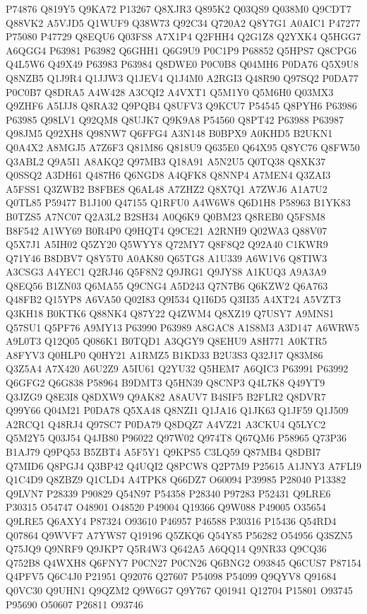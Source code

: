 P74876
Q819Y5
Q9KA72
P13267
Q8XJR3
Q895K2
Q03QS9
Q038M0
Q9CDT7
Q88VK2
A5VJD5
Q1WUF9
Q38W73
Q92C34
Q720A2
Q8Y7G1
A0AIC1
P47277
P75080
P47729
Q8EQU6
Q03FS8
A7X1P4
Q2FHH4
Q2G1Z8
Q2YXK4
Q5HGG7
A6QGG4
P63981
P63982
Q6GHH1
Q6G9U9
P0C1P9
P68852
Q5HPS7
Q8CPG6
Q4L5W6
Q49X49
P63983
P63984
Q8DWE0
P0C0B8
Q04MH6
P0DA76
Q5X9U8
Q8NZB5
Q1J9R4
Q1JJW3
Q1JEV4
Q1J4M0
A2RGI3
Q48R90
Q97SQ2
P0DA77
P0C0B7
Q8DRA5
A4W428
A3CQI2
A4VXT1
Q5M1Y0
Q5M6H0
Q03MX3
Q9ZHF6
A5IJJ8
Q8RA32
Q9PQB4
Q8UFV3
Q9KCU7
P54545
Q8PYH6
P63986
P63985
Q98LV1
Q92QM8
Q8UJK7
Q9K9A8
P54560
Q8PT42
P63988
P63987
Q98JM5
Q92XH8
Q98NW7
Q6FFG4
A3N148
B0BPX9
A0KHD5
B2UKN1
Q0A4X2
A8MGJ5
A7Z6F3
Q81M86
Q818U9
Q635E0
Q64X95
Q8YC76
Q8FW50
Q3ABL2
Q9A5I1
A8AKQ2
Q97MB3
Q18A91
A5N2U5
Q0TQ38
Q8XK37
Q0SSQ2
A3DH61
Q487H6
Q6NGD8
A4QFK8
Q8NNP4
A7MEN4
Q3ZAI3
A5FSS1
Q3ZWB2
B8FBE8
Q6AL48
A7ZHZ2
Q8X7Q1
A7ZWJ6
A1A7U2
Q0TL85
P59477
B1J100
Q47155
Q1RFU0
A4W6W8
Q6D1H8
P58963
B1YK83
B0TZS5
A7NC07
Q2A3L2
B2SH34
A0Q6K9
Q0BM23
Q8REB0
Q5FSM8
B8F542
A1WY69
B0R4P0
Q9HQT4
Q9CE21
A2RNH9
Q02WA3
Q88V07
Q5X7J1
A5IH02
Q5ZY20
Q5WYY8
Q72MY7
Q8F8Q2
Q92A40
C1KWR9
Q71Y46
B8DBV7
Q8Y5T0
A0AK80
Q65TG8
A1U339
A6W1V6
Q8TIW3
A3CSG3
A4YEC1
Q2RJ46
Q5F8N2
Q9JRG1
Q9JYS8
A1KUQ3
A9A3A9
Q8EQ56
B1ZN03
Q6MA55
Q9CNG4
A5D243
Q7N7B6
Q6KZW2
Q6A763
Q48FB2
Q15YP8
A6VA50
Q02I83
Q9I534
Q1I6D5
Q3II35
A4XT24
A5VZT3
Q3KH18
B0KTK6
Q88NK4
Q87Y22
Q4ZWM4
Q8XZ19
Q7USY7
A9MNS1
Q57SU1
Q5PF76
A9MY13
P63990
P63989
A8GAC8
A1S8M3
A3D147
A6WRW5
A9L0T3
Q12Q05
Q086K1
B0TQD1
A3QGY9
Q8EHU9
A8H771
A0KTR5
A8FYV3
Q0HLP0
Q0HY21
A1RMZ5
B1KD33
B2U3S3
Q32J17
Q83M86
Q3Z5A4
A7X420
A6U2Z9
A5IU61
Q2YU32
Q5HEM7
A6QIC3
P63991
P63992
Q6GFG2
Q6G838
P58964
B9DMT3
Q5HN39
Q8CNP3
Q4L7K8
Q49YT9
Q3JZG9
Q8E3I8
Q8DXW9
Q9AK82
A8AUV7
B4SIF5
B2FLR2
Q8DVR7
Q99Y66
Q04M21
P0DA78
Q5XA48
Q8NZI1
Q1JA16
Q1JK63
Q1JF59
Q1J509
A2RCQ1
Q48RJ4
Q97SC7
P0DA79
Q8DQZ7
A4VZ21
A3CKU4
Q5LYC2
Q5M2Y5
Q03J54
Q4JB80
P96022
Q97W02
Q974T8
Q67QM6
P58965
Q73P36
B1AJ79
Q9PQ53
B5ZBT4
A5F5Y1
Q9KPS5
C3LQ59
Q87MB4
Q8DBI7
Q7MID6
Q8PGJ4
Q3BP42
Q4UQI2
Q8PCW8
Q2P7M9
P25615
A1JNY3
A7FLI9
Q1C4D9
Q8ZBZ9
Q1CLD4
A4TPK8
Q66DZ7
O60094
P39985
P28040
P13382
Q9LVN7
P28339
P90829
Q54N97
P54358
P28340
P97283
P52431
Q9LRE6
P30315
O54747
O48901
O48520
P49004
Q19366
Q9W088
P49005
O35654
Q9LRE5
Q6AXY4
P87324
O93610
P46957
P46588
P30316
P15436
Q54RD4
Q07864
Q9WVF7
A7YWS7
Q19196
Q5ZKQ6
Q54Y85
P56282
O54956
Q3SZN5
Q75JQ9
Q9NRF9
Q9JKP7
Q5R4W3
Q642A5
A6QQ14
Q9NR33
Q9CQ36
Q752B8
Q4WXH8
Q6FNY7
P0CN27
P0CN26
Q6BNG2
O93845
Q6CUS7
P87154
Q4PFV5
Q6C4J0
P21951
Q92076
Q27607
P54098
P54099
Q9QYV8
Q91684
Q0VC30
Q9UHN1
Q9QZM2
Q9W6G7
Q9Y767
Q01941
Q12704
P15801
O93745
P95690
O50607
P26811
O93746
